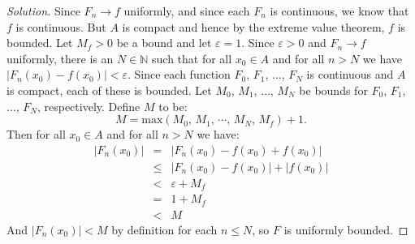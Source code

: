 \documentclass{article}
\theoremstyle{normal}
\begin{document}
        \begin{proof}[Solution]
            Since $F_{n}\rightarrow{f}$ uniformly, and since each $F_{n}$ is
            continuous, we know that $f$ is continuous. But $A$ is compact
            and hence by the extreme value theorem, $f$ is bounded. Let
            $M_{f}>0$ be a bound and let $\varepsilon=1$. Since $\varepsilon>0$
            and $F_{n}\rightarrow{f}$ uniformly, there is an $N\in\mathbb{N}$
            such that for all $x_{0}\in{A}$ and for all $n>N$ we have
            $|F_{n}(x_{0})-f(x_{0})|<\varepsilon$. Since each function
            $F_{0}$, $F_{1}$, $\dots$, $F_{N}$ is continuous and $A$ is compact,
            each of these is bounded. Let $M_{0}$, $M_{1}$, $\dots$, $M_{N}$
            be bounds for $F_{0}$, $F_{1}$, $\dots$, $F_{N}$, respectively.
            Define $M$ to be:
            \begin{equation}
                M
                =
                \textrm{max}\left(
                    M_{0},\,M_{1},\,\cdots,\,M_{N},\,M_{f}
                \right)+1.
            \end{equation}
            Then for all $x_{0}\in{A}$ and for all $n>N$ we have:
            \begin{equation}
                \begin{array}{rcl}
                    \displaystyle
                    |F_{n}(x_{0})|
                    \!\!
                    &=&
                    \!\!
                    \displaystyle
                    |F_{n}(x_{0})-f(x_{0})+f(x_{0})|\\[1em]
                    \!\!
                    &\leq&
                    \!\!
                    \displaystyle
                    |F_{n}(x_{0})-f(x_{0})|+|f(x_{0})|\\[1em]
                    \!\!
                    &<&
                    \!\!
                    \displaystyle
                    \varepsilon+M_{f}\\[1em]
                    \!\!
                    &=&
                    \!\!
                    \displaystyle
                    1+M_{f}\\[1em]
                    \!\!
                    &<&
                    \!\!
                    \displaystyle
                    M
                \end{array}
            \end{equation}
            And $|F_{n}(x_{0})|<M$ by definition for each $n\leq{N}$, so
            $F$ is uniformly bounded.
        \end{proof}
\end{document}
